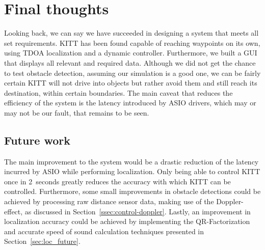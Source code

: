 \documentclass[11pt,titlepage]{report}
\begin{document}
\chapter{Final thoughts}
\label{ch:final-thoughts}
Looking back, we can say we have succeeded in designing a system that meets all set requirements. KITT has been found capable of reaching waypoints on its own, using TDOA localization and a dynamic controller. Furthermore, we built a GUI that displays all relevant and required data. Although we did not get the chance to test obstacle detection, assuming our simulation is a good one, we can be fairly certain KITT will not drive into objects but rather avoid them and still reach its destination, within certain boundaries. The main caveat that reduces the efficiency of the system is the latency introduced by ASIO drivers, which may or may not be our fault, that remains to be seen.

\section{Future work}
The main improvement to the system would be a drastic reduction of the latency incurred by ASIO while performing localization. Only being able to control KITT once in \SI{2}{seconds} greatly reduces the accuracy with which KITT can be controlled. Furthermore, some small improvements in obstacle detections could be achieved by processing raw distance sensor data, making use of the Doppler-effect, as discussed in Section~\ref{ssec:control-doppler}. Lastly, an improvement in localization accuracy could be achieved by implementing the QR-Factorization and accurate speed of sound calculation techniques presented in Section~\ref{sec:loc_future}.
\end{document}
